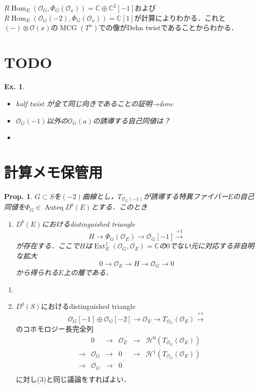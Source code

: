 \documentclass[uplatex,a4paper,11pt,dvipdfmx]{jsarticle}
\makeatletter
\theoremstyle{mystyle} %
\newtheorem{proposition}[theorem]{Prop.}
\newtheorem{example}[theorem]{Ex.}
\renewenvironment{proof}[1][\proofname]{\par
 \pushQED{\qed}%
 \normalfont \topsep6\p@\@plus6\p@\relax
 \trivlist
 \item[\hskip\labelsep
 \itshape
 {\bf\underline{#1}}]\ignorespaces
}{%
 \popQED\endtrivlist\@endpefalse
}
\DeclareMathOperator{\Auteq}{Auteq}\DeclareMathOperator{\Coh}{Coh}
\DeclareMathOperator{\Hom}{Hom}
\DeclareMathOperator{\Ext}{Ext}
\DeclareMathOperator{\MCG}{MCG}
\makeatother
\begin{document}
\begin{proof}
	$R\Hom_E(\mathcal{O}_G, \Phi_G(\mathcal{O}_x)) = \mathbb{C}\oplus\mathbb{C}^2[-1]$および$R\Hom_E(\mathcal{O}_G(-2), \Phi_G(\mathcal{O}_x)) = \mathbb{C}[1]$が計算によりわかる．これと$(-)\otimes \mathcal{O}(x)$の$\MCG(T^n)$での像がDehn twistであることからわかる．
\end{proof}
\section{TODO}
\begin{example}
	\begin{itemize}
		\item half twist が全て同じ向きであることの証明→done
		\item $\mathcal{O}_G(-1)$以外の$\mathcal{O}_G(a)$の誘導する自己同値は？
	\end{itemize}
\end{example}
\begin{itemize}
	\item
\end{itemize}

\section{計算メモ保管用}
\begin{proposition}
	$G \subset S$を$(-2)$曲線とし，$T_{\mathcal{O}_G(-1)}$が誘導する特異ファイバー$E$の自己同値を$\Phi_G \in \Auteq D^b(E)$とする．このとき
	\begin{enumerate}
		\item $D^b(E)$におけるdistinguished triangle$$H\to \Phi_G(\mathcal{O}_E)\to \mathcal{O}_G[-1] \xrightarrow{+1} $$が存在する．ここで$H$は$\Ext^1_E(\mathcal{O}_G, \mathcal{O}_E) = \mathbb{C}$の$0$でない元に対応する非自明な拡大$$0 \to \mathcal{O}_E \to H \to \mathcal{O}_G \to 0$$から得られる$E$上の層である．
	\end{enumerate}
\end{proposition}
\begin{proof}
	\begin{enumerate}
		\item \item $D^b(S)$におけるdistinguished triangle
		      $$ \mathcal{O}_G[-1] \oplus \mathcal{O}_G[-2] \to \mathcal{O}_E \to T_{\mathcal{O}_G}(\mathcal{O}_E)\xrightarrow{+1}$$のコホモロジー長完全列
		      \[
			      \begin{array}{ccccccc}
				       &     & 0             & \to & \mathcal{O}_E & \to & \mathcal{H}^{0}(T_{\mathcal{O}_G}(\mathcal{O}_E)) \\

				       & \to & \mathcal{O}_G & \to & 0             & \to & \mathcal{H}^1(T_{\mathcal{O}_G}(\mathcal{O}_E))   \\
				       & \to & \mathcal{O}_G & \to & 0             &     &                                                   \\
			      \end{array}
		      \]
		      に対し(3)と同じ議論をすればよい．
	\end{enumerate}
\end{proof}
\end{document}

